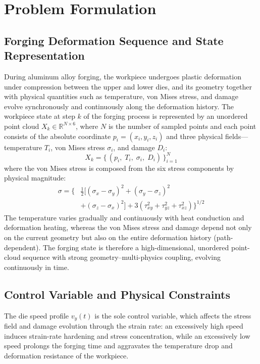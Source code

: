\section{Problem Formulation}

\subsection{Forging Deformation Sequence and State Representation}
During aluminum alloy forging, the workpiece undergoes plastic deformation under compression between the upper and lower dies, and its geometry together with physical quantities such as temperature, von Mises stress, and damage evolve synchronously and continuously along the deformation history. The workpiece state at step $k$ of the forging process is represented by an unordered point cloud $X_k \in \mathbb{R}^{N \times 6}$, where $N$ is the number of sampled points and each point consists of the absolute coordinate $p_i=(x_i,y_i,z_i)$ and three physical fields---temperature $T_i$, von Mises stress $\sigma_i$, and damage $D_i$:
\begin{equation}
X_k = \{\,(p_i,\; T_i,\; \sigma_i,\; D_i)\,\}_{i=1}^{N}
\label{equ:pointcloud}
\end{equation}
where the von Mises stress is composed from the six stress components by physical magnitude:
\begin{equation}
\begin{split}
\sigma = \Big\{ &\tfrac{1}{2}\big[(\sigma_x-\sigma_y)^2+(\sigma_y-\sigma_z)^2 \\
&+(\sigma_z-\sigma_x)^2\big]+3(\tau_{xy}^2+\tau_{yz}^2+\tau_{xz}^2)\Big\}^{1/2}
\end{split}
\end{equation}
The temperature varies gradually and continuously with heat conduction and deformation heating, whereas the von Mises stress and damage depend not only on the current geometry but also on the entire deformation history (path-dependent). The forging state is therefore a high-dimensional, unordered point-cloud sequence with strong geometry--multi-physics coupling, evolving continuously in time.

\subsection{Control Variable and Physical Constraints}
The die speed profile $v_y(t)$ is the sole control variable, which affects the stress field and damage evolution through the strain rate: an excessively high speed induces strain-rate hardening and stress concentration, while an excessively low speed prolongs the forging time and aggravates the temperature drop and deformation resistance of the workpiece.

